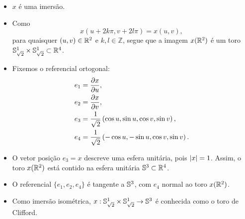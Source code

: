 \documentclass[12pt,a4paper]{beamer}
\theoremstyle{definition}
\begin{document}
\begin{frame}

	\begin{itemize}
		\item $x$ é uma imersão.
		
		\pause
	
		\item Como 
		\[x(u + 2k \pi, v + 2l \pi) = x(u,v), \] 
		para quaisquer $(u,v) \in \mathbb R^2$ e $k,l \in \mathbb{Z}$, segue que a imagem $x(\mathbb R^2)$ é um toro $\mathbb{S}_{\sqrt{2}}^1 \times \mathbb{S}_{\sqrt{2}}^1 \subset \mathbb R^4$.
		
		\pause
		
		\item Fixemos o referencial ortogonal:
		\begin{align*}
		e_1 &= \frac{\partial x}{\partial u},\\
		e_2 &= \frac{\partial x}{\partial v},\\
		e_3 &= \frac{1}{\sqrt{2}} \left( \cos u, \sin u, \cos v, \sin v \right),\\
		e_4 &= \frac{1}{\sqrt{2}} \left( -\cos u, -\sin u, \cos v, \sin v \right).
		\end{align*}
		
	\end{itemize}

\end{frame}

\begin{frame}

	\begin{itemize}
		
		\item O vetor posição $e_3 = x$ descreve uma esfera unitária, pois $\left| x \right| = 1$. Assim, o toro $x(\mathbb R^2)$ está contido na esfera unitária $\mathbb{S}^3 \subset \mathbb R^4$.
		
		\pause
		
		\item O referencial $\{e_1,e_2,e_4\}$ é tangente a $\mathbb{S}^3$, com
		$e_4$ normal ao toro $x(\mathbb R^2)$.
		
		\pause
		
		\item Como imersão isométrica, $x: \mathbb{S}_{\sqrt{2}}^1 \times \mathbb{S}_{\sqrt{2}}^1 \rightarrow \mathbb{S}^3$ é conhecida como o \alert{toro de Clifford}.
		
	\end{itemize}

\end{frame}
\end{document}
